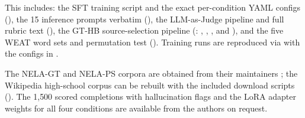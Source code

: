 \documentclass[11pt]{article}
\begin{document}
  This includes:
  the SFT training script and the exact per-condition YAML configs (),
  the 15 inference prompts verbatim (),
  the LLM-as-Judge pipeline and full rubric text (),
  the GT-HB source-selection pipeline (: , , , and ),
  and the five WEAT word sets and permutation test ().
  Training runs are reproduced via  with the configs in .

  The NELA-GT and NELA-PS corpora are obtained from their maintainers \cite{verhoeven2024, horne2024nelaps}; the Wikipedia high-school corpus can be rebuilt with the included download scripts ().
  The 1{,}500 scored completions with hallucination flags and the LoRA adapter weights for all four conditions are available from the authors on request.
\end{document}
